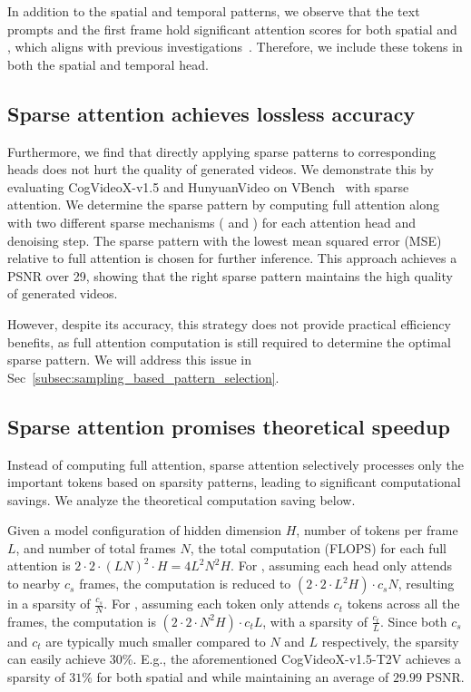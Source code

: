 In addition to the spatial and temporal patterns, we observe that the text prompts and the first frame hold significant attention scores for both spatial and \temporalhead{}, which aligns with previous investigations~\cite{xiao2024efficientstreaminglanguagemodels,shen2024longvuspatiotemporaladaptivecompression,su2025akvqvlattentionawarekvcache}. Therefore, we include these tokens in both the spatial and temporal head.


\subsection{Sparse attention achieves lossless accuracy}
\label{subsec:sparse-accurate}
Furthermore, we find that directly applying sparse patterns to corresponding heads does not hurt the quality of generated videos.
We demonstrate this by evaluating CogVideoX-v1.5 and HunyuanVideo on VBench~\citep{huang2023vbenchcomprehensivebenchmarksuite} with sparse attention. We determine the sparse pattern by computing full attention along with two different sparse mechanisms (\spatialhead{} and \temporalhead{}) for each attention head and denoising step. The sparse pattern with the lowest mean squared error (MSE) relative to full attention is chosen for further inference. This approach achieves a PSNR over 29, showing that the right sparse pattern maintains the high quality of generated videos.

However, despite its accuracy, this strategy does not provide practical efficiency benefits, as full attention computation is still required to determine the optimal sparse pattern. We will address this issue in Sec~\ref{subsec:sampling_based_pattern_selection}.


\subsection{Sparse attention promises theoretical speedup}
\label{sec:sparse-theoretical-speedup}
Instead of computing full attention, sparse attention selectively processes only the important tokens based on sparsity patterns, leading to significant computational savings. We analyze the theoretical computation saving below.

Given a model configuration of hidden dimension $H$, number of tokens per frame $L$, and number of total frames $N$, the total computation (FLOPS) for each full attention is $2\cdot2\cdot(LN)^2\cdot H=4L^2N^2H$. For \spatialhead{}, assuming each head only attends to nearby $c_s$ frames, the computation is reduced to $(2\cdot2\cdot L^2H)\cdot c_sN$, resulting in a sparsity of $\frac{c_s}{N}$. For \temporalhead{}, assuming each token only attends $c_t$ tokens across all the frames, the computation is $(2\cdot2\cdot N^2 H)\cdot c_tL$, with a sparsity of $\frac{c_t}{L}$. 
Since both $c_s$ and $c_t$ are typically much smaller compared to $N$ and $L$ respectively, the sparsity can easily achieve $30$\%.
E.g., the aforementioned CogVideoX-v1.5-T2V achieves a sparsity of $31$\% for both spatial and \temporalhead{} while maintaining an average of $29.99$ PSNR.


